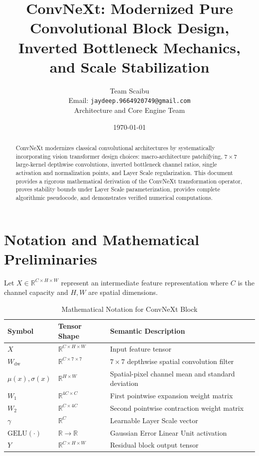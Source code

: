 \documentclass[11pt,a4paper]{article}
\title{ConvNeXt: Modernized Pure Convolutional Block Design, Inverted Bottleneck Mechanics, and Scale Stabilization}
\author{Team Scaibu \\ \small Email: \texttt{jaydeep.9664920749@gmail.com} \\ \small Architecture and Core Engine Team}
\date{\today}
\theoremstyle{definition}
\begin{document}
\maketitle

\begin{abstract}
ConvNeXt modernizes classical convolutional architectures by systematically incorporating vision transformer design choices: macro-architecture patchifying, $7 \times 7$ large-kernel depthwise convolutions, inverted bottleneck channel ratios, single activation and normalization points, and Layer Scale regularization. This document provides a rigorous mathematical derivation of the ConvNeXt transformation operator, proves stability bounds under Layer Scale parameterization, provides complete algorithmic pseudocode, and demonstrates verified numerical computations.
\end{abstract}

\section{Notation and Mathematical Preliminaries}

Let $X \in \mathbb{R}^{C \times H \times W}$ represent an intermediate feature representation where $C$ is the channel capacity and $H, W$ are spatial dimensions.

\begin{table}[h]
\centering
\caption{Mathematical Notation for ConvNeXt Block}
\begin{tabular}{lll}
\toprule
\textbf{Symbol} & \textbf{Tensor Shape} & \textbf{Semantic Description} \\
\midrule
$X$ & $\mathbb{R}^{C \times H \times W}$ & Input feature tensor \\
$W_{\text{dw}}$ & $\mathbb{R}^{C \times 7 \times 7}$ & $7 \times 7$ depthwise spatial convolution filter \\
$\mu(x), \sigma(x)$ & $\mathbb{R}^{H \times W}$ & Spatial-pixel channel mean and standard deviation \\
$W_1$ & $\mathbb{R}^{4C \times C}$ & First pointwise expansion weight matrix \\
$W_2$ & $\mathbb{R}^{C \times 4C}$ & Second pointwise contraction weight matrix \\
$\gamma$ & $\mathbb{R}^C$ & Learnable Layer Scale vector \\
$\text{GELU}(\cdot)$ & $\mathbb{R} \to \mathbb{R}$ & Gaussian Error Linear Unit activation \\
$Y$ & $\mathbb{R}^{C \times H \times W}$ & Residual block output tensor \\
\bottomrule
\end{tabular}
\end{table}
\end{document}
